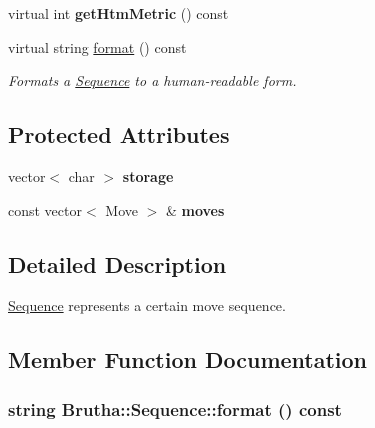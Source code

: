 \begin{CompactItemize}
\item 
\hypertarget{classBrutha_1_1Sequence_3e2ec4f84a589c4ac3cfb2d5810b1a0b}{
virtual int \textbf{getHtmMetric} () const }
\label{classBrutha_1_1Sequence_3e2ec4f84a589c4ac3cfb2d5810b1a0b}

\item 
virtual string \hyperlink{classBrutha_1_1Sequence_a33a3b258707feb3b35e94b780b22ee4}{format} () const 
\begin{CompactList}\small\item\em Formats a \hyperlink{classBrutha_1_1Sequence}{Sequence} to a human-readable form. \item\end{CompactList}\end{CompactItemize}
\subsection*{Protected Attributes}
\begin{CompactItemize}
\item 
\hypertarget{classBrutha_1_1Sequence_e462d084fb3674cd8667cef4fdd9d7d8}{
vector$<$ char $>$ \textbf{storage}}
\label{classBrutha_1_1Sequence_e462d084fb3674cd8667cef4fdd9d7d8}

\item 
\hypertarget{classBrutha_1_1Sequence_1a72ab6f5624bebb3ec99ff463f7eccd}{
const vector$<$ Move $>$ \& \textbf{moves}}
\label{classBrutha_1_1Sequence_1a72ab6f5624bebb3ec99ff463f7eccd}

\end{CompactItemize}


\subsection{Detailed Description}
\hyperlink{classBrutha_1_1Sequence}{Sequence} represents a certain move sequence. 

\subsection{Member Function Documentation}
\hypertarget{classBrutha_1_1Sequence_a33a3b258707feb3b35e94b780b22ee4}{
\subsubsection[{format}]{\setlength{\rightskip}{0pt plus 5cm}string Brutha::Sequence::format () const}}
\label{classBrutha_1_1Sequence_a33a3b258707feb3b35e94b780b22ee4}


